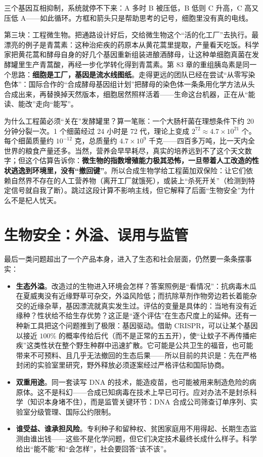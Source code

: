 三个基因互相抑制，系统就停不下来：A 多时 B 被压低，B 低则 C 升高，C 高又压低 A——如此循环。方框和箭头只是帮助思考的记号，细胞里没有真的电线。

第三块：工程微生物。把通路设计好后，交给微生物这个“活的化工厂”去执行。最漂亮的例子是青蒿素：这种治疟疾的药原本从黄花蒿里提取，产量看天吃饭。科学家把黄花蒿和酵母自身的好几个基因重新组装进酿酒酵母，让这种单细胞真菌在发酵罐里生产青蒿酸，再经一步化学转化得到青蒿素。第 83 章的重组胰岛素是同一个思路：\textbf{细胞是工厂，基因是流水线图纸}。走得更远的团队已经在尝试“从零写染色体”：国际合作的“合成酵母基因组计划”把酵母的染色体一条条用化学方法从头合成出来，再替换掉天然版本，细胞居然照样活着——生命这台机器，正在从“能读、能改”走向“能写”。

\begin{tiaozhan}
为什么工程菌必须“关在”发酵罐里？算一笔账：一个大肠杆菌在理想条件下约 20 分钟分裂一次。1 个细菌经过 24 小时是 72 代，理论上变成 $2^{72} \approx 4.7\times 10^{21}$ 个。每个细菌质量约 $10^{-12}$ 克，总质量约 $4.7\times 10^{9}$ 千克——四百多万吨，比一天内全世界的粮食产量还多。当然，营养会早早耗尽，真实的培养远到不了这个天文数字；但这个估算告诉你：\textbf{微生物的指数增殖能力极其恐怖，一旦带着人工改造的性状逃逸到环境里，没有“撤回键”}。所以合成生物学给工程菌加双保险：让它们依赖自然界不存在的人工营养物（离开工厂就饿死），或装上“杀死开关”（检测到特定信号就自我了断）。跳过这段计算不影响主线，但它解释了后面“生物安全”为什么不是杞人忧天。
\end{tiaozhan}

\section{生物安全：外溢、误用与监管}

最后一类问题超出了一个产品本身，进入了生态和社会层面，仍然要一条条摆事实：

\begin{itemize}[itemsep=2pt]
\item \textbf{生态外溢}。改造过的生物进入环境会怎样？答案照例是“看情况”：抗病毒木瓜在夏威夷没有近缘野草可杂交，外溢风险低；而抗除草剂作物旁边若长着能杂交的近缘杂草，基因漂流就真实发生过。评估的变量是具体的：当地有没有近缘种？性状给不给生存优势？这正是“逐个评估”在生态尺度上的延伸。还有一种新工具把这个问题推到了极限：基因驱动。借助 CRISPR，可以让某个基因以接近 $100\%$ 的概率传给后代（而不是正常的五五开），使“让蚊子不再传播疟疾”这类性状在整个野生种群中迅速扩散。它可能是公共卫生的福音，也可能带来不可预料、且几乎无法撤回的生态后果——所以目前的共识是：先在严格封闭的实验室里研究，野外释放必须逐案经过严格评估和国际协商。
\item \textbf{双重用途}。同一套读写 DNA 的技术，能造疫苗，也可能被用来制造危险的病原体。这不是科幻——合成已知病毒在技术上早已可行。应对办法不是封杀科学（知识本身堵不住），而是监管关键环节：DNA 合成公司筛查订单序列、实验室分级管理、国际公约限制。
\item \textbf{谁受益、谁承担风险}。专利种子和留种权、贫困家庭用不用得起、长期生态监测由谁出钱——这些不是化学问题，但它们决定技术最终长成什么样子。科学给出“能不能”和“会怎样”，社会要回答“该不该”。
\end{itemize}

